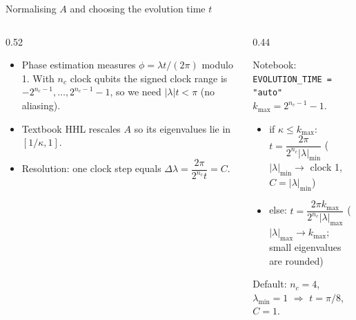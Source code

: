 \documentclass[aspectratio=169,11pt]{beamer}
\begin{document}
\begin{frame}{Normalising $A$ and choosing the evolution time $t$}
  \begin{columns}[T]
    \begin{column}{0.52\textwidth}
      \small
      \begin{itemize}
        \item Phase estimation measures $\phi = \lambda t/(2\pi)$ modulo 1. With $n_c$ clock qubits the signed clock range is
          $-2^{n_c-1}, \dots, 2^{n_c-1} - 1$, so we need $|\lambda|t < \pi$ (no aliasing).
        \item Textbook HHL rescales $A$ so its eigenvalues lie in $[1/\kappa, 1]$.
        \item Resolution: one clock step equals $\Delta\lambda = \dfrac{2\pi}{2^{n_c}t} = C$.
      \end{itemize}
    \end{column}
    \begin{column}{0.44\textwidth}
      \begin{block}{Notebook: \texttt{EVOLUTION\_TIME = "auto"}}
        \footnotesize $k_{\max} = 2^{n_c-1} - 1$.
        \begin{itemize}
          \item if $\kappa \le k_{\max}$: $t = \dfrac{2\pi}{2^{n_c}|\lambda|_{\min}}$ ($|\lambda|_{\min}\to$ clock 1, $C = |\lambda|_{\min}$)
          \item else: $t = \dfrac{2\pi k_{\max}}{2^{n_c}|\lambda|_{\max}}$ ($|\lambda|_{\max}\to k_{\max}$; small eigenvalues are rounded)
        \end{itemize}
        Default: $n_c = 4$, $\lambda_{\min} = 1$ $\Rightarrow$ $t = \pi/8$, $C = 1$.
      \end{block}
    \end{column}
  \end{columns}
\end{frame}

\end{document}
